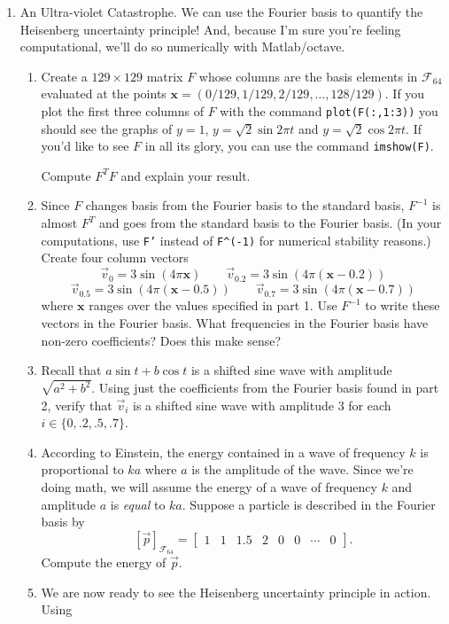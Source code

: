 \documentclass[letter]{article}
\newcommand{\mat}[1]{\begin{bmatrix}#1\end{bmatrix}}
\begin{document}
\begin{enumerate}
		\item {\sc An Ultra-violet Catastrophe}.  We can use the Fourier basis to quantify the Heisenberg uncertainty
			principle!  And, because I'm sure you're feeling computational, we'll do so numerically with Matlab/octave.
			\begin{enumerate}
				\item Create a $129\times 129$ matrix $F$ whose columns are the basis elements in $\mathcal F_{64}$
					evaluated at the points $\mathbf x=(0/129,1/129,2/129,\ldots,128/129)$.  If you plot the first three columns of
					$F$ with the command {\tt plot(F(:,1:3))} you should see the graphs of $y=1$, $y=\sqrt{2}\sin 2\pi t$
					and $y=\sqrt{2}\cos 2\pi t$.  If you'd like to see $F$ in all its glory, you can use
					the command {\tt imshow(F)}.

					Compute $F^TF$ and explain your result.
				\item Since $F$ changes basis from the Fourier basis to the standard basis, $F^{-1}$ is almost $F^T$ and goes
					from the standard basis to the Fourier basis.  (In your computations, use {\tt F'} instead of
					{\tt F\textasciicircum(-1)} for numerical stability reasons.)  Create four column vectors
					\[
					\vec v_0=3\sin(4\pi \mathbf x)\qquad \vec v_{0.2}=3\sin(4\pi (\mathbf x-0.2))\]\[
						\vec v_{0.5}=3\sin(4\pi (\mathbf x-0.5))\qquad\vec v_{0.7}=3\sin(4\pi (\mathbf x-0.7))
					\]
					where $\mathbf x$ ranges over the values specified in part 1.  Use $F^{-1}$ to write
					these vectors in the Fourier basis.  What frequencies in the Fourier basis have non-zero coefficients?
					Does this make sense?
				\item Recall that $a\sin t+b\cos t$ is a shifted sine wave with amplitude $\sqrt{a^2+b^2}$.  Using just the 
					coefficients from the Fourier basis found in part 2, verify that $\vec v_i$ is a shifted sine wave
					with amplitude 3 for each $i\in\{0,.2,.5,.7\}$.
				\item According to Einstein, the energy contained in a wave of frequency $k$ is proportional to $ka$
					where $a$ is the amplitude of the wave.
					Since we're doing math, we will assume the energy of a wave of frequency $k$ and amplitude $a$
					is \emph{equal} to $ka$.  Suppose a particle is described in the Fourier basis by
					\[
						[\vec p]_{\mathcal F_{64}}=\mat{1&1&1.5&2&0&0&\cdots & 0}.
					\]
					Compute the energy of $\vec p$.
				\item We are now ready to see the Heisenberg uncertainty principle in action.  Using

\end{enumerate}
\end{enumerate}
\end{document}
